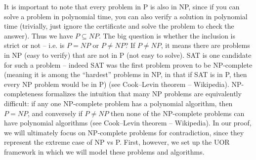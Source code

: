 \documentclass[11pt]{article}
\begin{document}
It is important to note that every problem in P is also in NP, since if you can solve a problem in polynomial time, you can also verify a solution in polynomial time (trivially, just ignore the certificate and solve the problem to check the answer). Thus we have \(P \subseteq NP\). The big question is whether the inclusion is strict or not -- i.e. is \(P = NP\) or \(P \neq NP\)? If \(P \neq NP\), it means there are problems in NP (easy to verify) that are not in P (not easy to solve). SAT is one candidate for such a problem -- indeed SAT was the first problem proven to be NP-complete (meaning it is among the “hardest” problems in NP, in that if SAT is in P, then every NP problem would be in P) (see Cook--Levin theorem -- Wikipedia). NP-completeness formalizes the intuition that many NP problems are equivalently difficult: if any one NP-complete problem has a polynomial algorithm, then \(P = NP\), and conversely if \(P \neq NP\) then none of the NP-complete problems can have polynomial algorithms (see Cook--Levin theorem -- Wikipedia). In our proof, we will ultimately focus on NP-complete problems for contradiction, since they represent the extreme case of NP vs P. First, however, we set up the UOR framework in which we will model these problems and algorithms.
\end{document}
